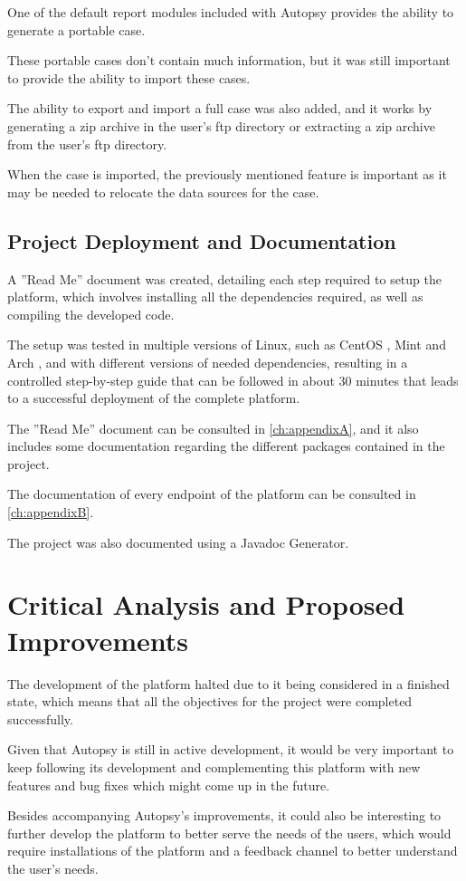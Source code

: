 One of the default report modules included with Autopsy provides the ability to generate a portable case.

These portable cases don't contain much information, but it was still important to provide the ability to import these cases.

The ability to export and import a full case was also added, and it works by generating a zip archive in the user's \acrshort{ftp} directory or extracting a zip archive from the user's \acrshort{ftp} directory.

When the case is imported, the previously mentioned feature is important as it may be needed to relocate the data sources for the case.

\subsection{Project Deployment and Documentation}

A ''Read Me'' document was created, detailing each step required to setup the platform, which involves installing all the dependencies required, as well as compiling the developed code.

The setup was tested in multiple versions of Linux,  such as CentOS \cite{centos}, Mint \cite{mint} and Arch \cite{arch}, and with different versions of needed dependencies, resulting in a controlled step-by-step guide that can be followed in about 30 minutes that leads to a successful deployment of the complete platform.

The ''Read Me'' document can be consulted in \autoref{ch:appendixA}, and it also includes some documentation regarding the different packages contained in the project.

The documentation of every endpoint of the platform can be consulted in \autoref{ch:appendixB}.

The project was also documented using a Javadoc Generator.

\section{Critical Analysis and Proposed Improvements}

The development of the platform halted due to it being considered in a finished state, which means that all the objectives for the project were completed successfully.

Given that Autopsy is still in active development, it would be very important to keep following its development and complementing this platform with new features and bug fixes which might come up in the future.

Besides accompanying Autopsy's improvements, it could also be interesting to further develop the platform to better serve the needs of the users, which would require installations of the platform and a feedback channel to better understand the user's needs.

